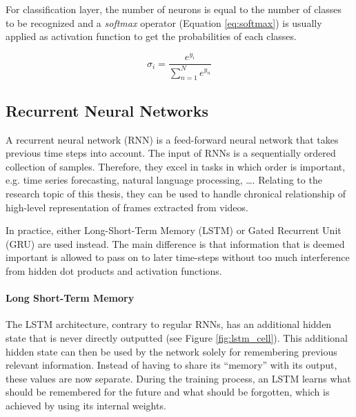             For classification layer, the number of neurons is equal to the number of classes to be recognized and a \textit{softmax} operator (Equation \eqref{eq:softmax}) is usually applied as activation function to get the probabilities of each classes.

            \begin{equation}
                \sigma_i = \frac{e^{y_i}}{\sum_{n=1}^{N}e^{y_n}}
                \label{eq:softmax}
            \end{equation}

    \subsection{Recurrent Neural Networks}
        A recurrent neural network (RNN) is a feed-forward neural network that takes previous time steps into account.
        The input of RNNs is a sequentially ordered collection of samples.
        Therefore, they excel in tasks in which order is important, e.g. time series forecasting, natural language processing, \dots.
        Relating to the research topic of this thesis, they can be used to handle chronical relationship of high-level representation of frames extracted from videos.

        In practice, either Long-Short-Term Memory (LSTM) or Gated Recurrent Unit (GRU) are used instead. 
        The main difference is that information that is deemed important is allowed to pass on to later time-steps without too much interference from hidden dot products and activation functions.

        \paragraph{Long Short-Term Memory}
        The LSTM architecture, contrary to regular RNNs, has an additional hidden state that is never directly outputted (see Figure \ref{fig:lstm_cell}). 
        This additional hidden state can then be used by the network solely for remembering previous relevant information. 
        Instead of having to share its ``memory'' with its output, these values are now separate. 
        During the training process, an LSTM learns what should be remembered for the future and what should be forgotten, which is achieved by using its internal weights.

